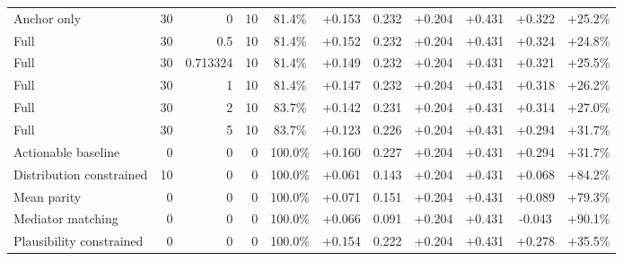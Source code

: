 \begin{table}[htbp]
\begin{tabular}{lrrrccccccc}
Anchor only & 30 & 0 & 10 & 81.4\% & +0.153 & 0.232 & +0.204 & +0.431 & +0.322 & +25.2\% \\
Full & 30 & 0.5 & 10 & 81.4\% & +0.152 & 0.232 & +0.204 & +0.431 & +0.324 & +24.8\% \\
Full & 30 & 0.713324 & 10 & 81.4\% & +0.149 & 0.232 & +0.204 & +0.431 & +0.321 & +25.5\% \\
Full & 30 & 1 & 10 & 81.4\% & +0.147 & 0.232 & +0.204 & +0.431 & +0.318 & +26.2\% \\
Full & 30 & 2 & 10 & 83.7\% & +0.142 & 0.231 & +0.204 & +0.431 & +0.314 & +27.0\% \\
Full & 30 & 5 & 10 & 83.7\% & +0.123 & 0.226 & +0.204 & +0.431 & +0.294 & +31.7\% \\
Actionable baseline & 0 & 0 & 0 & 100.0\% & +0.160 & 0.227 & +0.204 & +0.431 & +0.294 & +31.7\% \\
Distribution constrained & 10 & 0 & 0 & 100.0\% & +0.061 & 0.143 & +0.204 & +0.431 & +0.068 & +84.2\% \\
Mean parity & 0 & 0 & 0 & 100.0\% & +0.071 & 0.151 & +0.204 & +0.431 & +0.089 & +79.3\% \\
Mediator matching & 0 & 0 & 0 & 100.0\% & +0.066 & 0.091 & +0.204 & +0.431 & -0.043 & +90.1\% \\
Plausibility constrained & 0 & 0 & 0 & 100.0\% & +0.154 & 0.222 & +0.204 & +0.431 & +0.278 & +35.5\% \\
\bottomrule
\end{tabular}
\end{table}